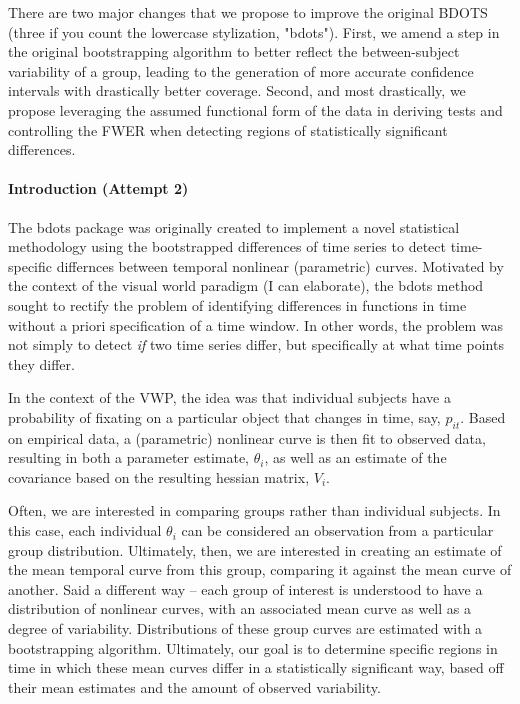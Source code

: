 \documentclass{article}
\begin{document}
There are two major changes that we propose to improve the original BDOTS (three if you count the lowercase stylization, "bdots"). First, we amend a step in the original bootstrapping algorithm to better reflect the between-subject variability of a group, leading to the generation of more accurate confidence intervals with drastically better coverage. Second, and most drastically, we propose leveraging the assumed functional form of the data in deriving tests and controlling the FWER when detecting regions of statistically significant differences.

\paragraph{Introduction (Attempt 2)} The bdots package was originally created to implement a novel statistical methodology using the bootstrapped differences of time series to detect time-specific differnces between temporal nonlinear (parametric) curves. Motivated by the context of the visual world paradigm (I can elaborate), the bdots method sought to rectify the problem of identifying differences in functions in time without a priori specification of a time window. In other words, the problem was not simply to detect \textit{if} two time series differ, but specifically at what time points they differ. 

In the context of the VWP, the idea was that individual subjects have a probability of fixating on a particular object that changes in time, say, $p_{it}$. Based on empirical data, a (parametric) nonlinear curve is then fit to observed data, resulting in both a parameter estimate, $\theta_i$, as well as an estimate of the covariance based on the resulting hessian matrix, $V_i$.

Often, we are interested in comparing groups rather than individual subjects. In this case, each individual $\theta_i$ can be considered an observation from a particular group distribution. Ultimately, then, we are interested in creating an estimate of the mean temporal curve from this group, comparing it against the mean curve of another. Said a different way -- each group of interest is understood to have a distribution of nonlinear curves, with an associated mean curve as well as a degree of variability. Distributions of these group curves are estimated with a bootstrapping algorithm. Ultimately, our goal is to determine specific regions in time in which these mean curves differ in a statistically significant way, based off their mean estimates and the amount of observed variability.
\end{document}
